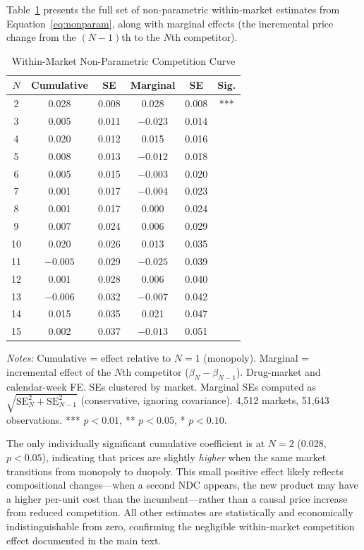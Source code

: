 \documentclass[12pt]{article}
\begin{document}
Table~\ref{tab:nonparam_full} presents the full set of non-parametric within-market estimates from Equation~\ref{eq:nonparam}, along with marginal effects (the incremental price change from the $(N-1)$th to the $N$th competitor).

\begin{table}[H]
\centering
\caption{Within-Market Non-Parametric Competition Curve}\label{tab:nonparam_full}
\begin{threeparttable}
\begin{tabular}{cccccc}
\toprule
$N$ & Cumulative & SE & Marginal & SE & Sig. \\
\midrule
2 & 0.028 & 0.008 & 0.028 & 0.008 & *** \\
3 & 0.005 & 0.011 & $-0.023$ & 0.014 & \\
4 & 0.020 & 0.012 & 0.015 & 0.016 & \\
5 & 0.008 & 0.013 & $-0.012$ & 0.018 & \\
6 & 0.005 & 0.015 & $-0.003$ & 0.020 & \\
7 & 0.001 & 0.017 & $-0.004$ & 0.023 & \\
8 & 0.001 & 0.017 & 0.000 & 0.024 & \\
9 & 0.007 & 0.024 & 0.006 & 0.029 & \\
10 & 0.020 & 0.026 & 0.013 & 0.035 & \\
11 & $-0.005$ & 0.029 & $-0.025$ & 0.039 & \\
12 & 0.001 & 0.028 & 0.006 & 0.040 & \\
13 & $-0.006$ & 0.032 & $-0.007$ & 0.042 & \\
14 & 0.015 & 0.035 & 0.021 & 0.047 & \\
15 & 0.002 & 0.037 & $-0.013$ & 0.051 & \\
\bottomrule
\end{tabular}
\begin{tablenotes}[flushleft]
\small
\item \textit{Notes:} Cumulative = effect relative to $N = 1$ (monopoly). Marginal = incremental effect of the $N$th competitor ($\beta_N - \beta_{N-1}$). Drug-market and calendar-week FE. SEs clustered by market. Marginal SEs computed as $\sqrt{\text{SE}_N^2 + \text{SE}_{N-1}^2}$ (conservative, ignoring covariance). 4,512 markets, 51,643 observations. *** $p < 0.01$, ** $p < 0.05$, * $p < 0.10$.
\end{tablenotes}
\end{threeparttable}
\end{table}

The only individually significant cumulative coefficient is at $N = 2$ (0.028, $p < 0.05$), indicating that prices are slightly \emph{higher} when the same market transitions from monopoly to duopoly. This small positive effect likely reflects compositional changes---when a second NDC appears, the new product may have a higher per-unit cost than the incumbent---rather than a causal price increase from reduced competition. All other estimates are statistically and economically indistinguishable from zero, confirming the negligible within-market competition effect documented in the main text.
\end{document}
